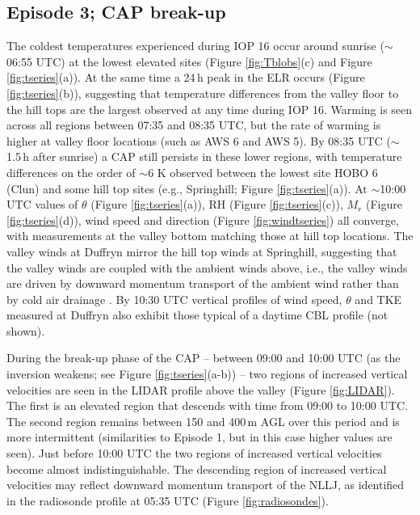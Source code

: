\documentclass[times]{qjrms4}
\begin{document}
\subsection{Episode 3; CAP break-up}
\label{ep4}
The coldest temperatures experienced during IOP 16 occur around sunrise ($\sim$06:55 UTC) at the lowest elevated sites (Figure \ref{fig:Tblobs}(c) and Figure \ref{fig:tseries}(a)). At the same time a 24$\,\mbox{h}$ peak in the ELR occurs (Figure \ref{fig:tseries}(b)), suggesting that temperature differences from the valley floor to the hill tops are the largest observed at any time during IOP 16. Warming is seen across all regions between 07:35 and 08:35 UTC, but the rate of warming is higher at valley floor locations (such as AWS 6 and AWS 5). By 08:35 UTC ($\sim$1.5$\,\mbox{h}$ after sunrise) a CAP still persists in these lower regions, with temperature differences on the order of $\sim$6 K observed between the lowest site HOBO 6 (Clun) and some hill top sites (e.g., Springhill; Figure \ref{fig:tseries}(a)). At $\sim$10:00 UTC values of $\theta$ (Figure \ref{fig:tseries}(a)), RH (Figure \ref{fig:tseries}(c)), $M_r$ (Figure \ref{fig:tseries}(d)), wind speed and direction (Figure \ref{fig:windtseries}) all converge, with measurements at the valley bottom matching those at hill top locations. The valley winds at Duffryn mirror the hill top winds at Springhill, suggesting that the valley winds are coupled with the ambient winds above, i.e., the valley winds are driven by downward momentum transport of the ambient wind rather than by cold air drainage \citep{whiteman1993relationship}. By 10:30 UTC vertical profiles of wind speed, $\theta$ and TKE measured at Duffryn also exhibit those typical of a daytime CBL profile (not shown).

During the break-up phase of the CAP -- between 09:00 and 10:00 UTC (as the inversion weakens; see Figure \ref{fig:tseries}(a-b)) -- two regions of increased vertical velocities are seen in the LIDAR profile above the valley (Figure \ref{fig:LIDAR}). The first is an elevated region that descends with time from 09:00 to 10:00 UTC. The second region remains between 150 and 400$\,\mbox{m}$ AGL over this period and is more intermittent (similarities to Episode 1, but in this case higher values are seen). Just before 10:00 UTC the two regions of increased vertical velocities become almost indistinguishable. The descending region of increased vertical velocities may reflect downward momentum transport of the NLLJ, as identified in the radiosonde profile at 05:35 UTC (Figure \ref{fig:radiosondes}). 
\end{document}
